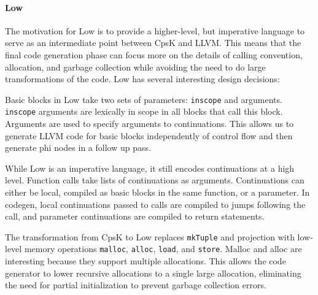 \documentclass{article}
\begin{document}
\paragraph{Low} The motivation for Low is to provide a higher-level, but imperative language to serve as an intermediate point between CpsK and LLVM. This means that the final code generation phase can focus more on the details of calling convention, allocation, and garbage collection while avoiding the need to do large transformations of the code. Low has several interesting design decisions:
\begin{description}
\item[Functional Blocks] Basic blocks in Low take two sets of parameters: \lstinline!inscope! and arguments. \lstinline!inscope! arguments are lexically in scope in all blocks that call this block. Arguments are used to specify arguments to continuations. This allows us to generate LLVM code for basic blocks independently of control flow and then generate phi nodes in a follow up pass.
\item[Continuation-passing style] While Low is an imperative language, it still encodes continuations at a high level. Function calls take lists of continuations as arguments. Continuations can either be local, compiled as basic blocks in the same function, or a parameter. In codegen, local continuations passed to calls are compiled to jumps following the call, and parameter continuations are compiled to return statements.
\item[Explicit Memory Operations] The transformation from CpsK to Low replaces \lstinline!mkTuple! and projection with low-level memory operations  \lstinline!malloc!, \lstinline!alloc!, \lstinline!load!, and \lstinline!store!. Malloc and alloc are interesting because they support multiple allocations. This allows the code generator to lower recursive allocations to a single large allocation, eliminating the need for partial initialization to prevent garbage collection errors.
\end{description}
\end{document}
